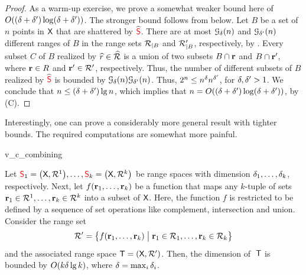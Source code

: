 \begin{proof}
    As a warm-up exercise, we prove a somewhat weaker bound here of
    $O( (\Dim + \DimA) \log \pth{\Dim + \DimA} )$. The stronger bound
    follows from  below.  Let $B$ be a set of
    $n$ points in $\textsf{X}$ that are shattered by
    $\widehat{{\textcolor{red}{\mathsf{S}}}}$. There are at most $\Growth{\Dim}{n }$ and
    $\Growth{\DimA}{n }$ different ranges of $B$ in the range sets
    ${\mathcal{R}}_{|B}$ and $\mathcal{R}'_{|B}$,
    respectively, by . Every subset $C$ of $B$ realized
    by $\widehat{r} \in \widehat{{\mathcal{R}}}$ is a union of two subsets
    $B \cap \mathbf{r}$ and $B \cap \mathbf{r}'$, where $\mathbf{r} \in R$ and
    $\mathbf{r}' \in \mathcal{R}'$, respectively.  Thus, the number of
    different subsets of $B$ realized by $\widehat{{\textcolor{red}{\mathsf{S}}}}$ is
    bounded by $\Growth{\Dim}{n} \Growth{\DimA}{n }$. Thus, $2^n \leq
    n^{\delta} n^{\delta'}$, for $\delta, \delta' > 1$.  We conclude that $n
    \leq (\delta + \delta') \lg n$, which implies that $n = O \pth{
       \pth[]{\Dim + \DimA} \log\pth{ \Dim + \DimA}}$, by
    (C).
\end{proof}



Interestingly, one can prove a considerably more general result with
tighter bounds. The required computations are somewhat more painful.

\begin{fragment}{v_c_combining}
    \begin{theorem}
        Let
        $\RangeSpace_1 = \pth{\GroundSet,\RangeSet^1}, \ldots,
        \RangeSpace_k = \pth{\GroundSet,\RangeSet^k}$
        be range spaces with \VC dimension $\delta_1, \ldots, \delta_k$,
        respectively.  Next, let $f\pth{ \range_1, \ldots, \range_k}$
        be a function that maps any $k$-tuple of sets
        $\mathbf{r}_1 \in {\mathcal{R}}^1, \ldots, \mathbf{r}_k \in {\mathcal{R}}^k$
        into a subset of $\textsf{X}$. Here, the function $f$ is
        restricted to be defined by a sequence of set operations like
        complement, intersection and union.  Consider the range set
        \begin{align*}
          \RangeSetA%
          =%
          \Set{ f\pth{ \range_1, \ldots, \range_k}}{ \range_1
          \in \RangeSet_1, \ldots, \range_k \in \RangeSet_k \bigr.}
        \end{align*}
        and the associated range space $\RangeSpaceA =
        \pth{\GroundSet, \RangeSetA}$. Then, the \VC dimension of
        $\;\mathsf{T}$ is bounded by $O\pth{ k \Dim \lg k}$, where
        $\delta = \max_i \delta_i$.
        
    \end{theorem}
\end{fragment}

